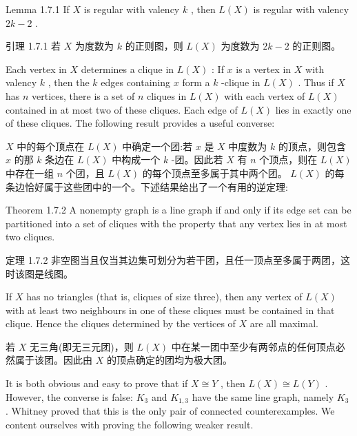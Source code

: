 \documentclass[10pt]{article}
\begin{document}
Lemma 1.7.1 If \(X\) is regular with valency \(k\) , then \(L\left( X\right)\) is regular with valency \({2k} - 2\) .

\begin{tcolorbox}\relax
引理 1.7.1 若 \(X\) 为度数为 \(k\) 的正则图，则 \(L\left( X\right)\) 为度数为 \({2k} - 2\) 的正则图。
\end{tcolorbox}

Each vertex in \(X\) determines a clique in \(L\left( X\right)\) : If \(x\) is a vertex in \(X\) with valency \(k\) , then the \(k\) edges containing \(x\) form a \(k\) -clique in \(L\left( X\right)\) . Thus if \(X\) has \(n\) vertices, there is a set of \(n\) cliques in \(L\left( X\right)\) with each vertex of \(L\left( X\right)\) contained in at most two of these cliques. Each edge of \(L\left( X\right)\) lies in exactly one of these cliques. The following result provides a useful converse:

\begin{tcolorbox}\relax
\(X\) 中的每个顶点在 \(L\left( X\right)\) 中确定一个团:若 \(x\) 是 \(X\) 中度数为 \(k\) 的顶点，则包含 \(x\) 的那 \(k\) 条边在 \(L\left( X\right)\) 中构成一个 \(k\) -团。因此若 \(X\) 有 \(n\) 个顶点，则在 \(L\left( X\right)\) 中存在一组 \(n\) 个团，且 \(L\left( X\right)\) 的每个顶点至多属于其中两个团。 \(L\left( X\right)\) 的每条边恰好属于这些团中的一个。下述结果给出了一个有用的逆定理:
\end{tcolorbox}

Theorem 1.7.2 A nonempty graph is a line graph if and only if its edge set can be partitioned into a set of cliques with the property that any vertex lies in at most two cliques.

\begin{tcolorbox}\relax
定理 1.7.2 非空图当且仅当其边集可划分为若干团，且任一顶点至多属于两团，这时该图是线图。
\end{tcolorbox}

If \(X\) has no triangles (that is, cliques of size three), then any vertex of \(L\left( X\right)\) with at least two neighbours in one of these cliques must be contained in that clique. Hence the cliques determined by the vertices of \(X\) are all maximal.

\begin{tcolorbox}\relax
若 \(X\) 无三角(即无三元团)，则 \(L\left( X\right)\) 中在某一团中至少有两邻点的任何顶点必然属于该团。因此由 \(X\) 的顶点确定的团均为极大团。
\end{tcolorbox}

It is both obvious and easy to prove that if \(X \cong  Y\) , then \(L\left( X\right)  \cong  L\left( Y\right)\) . However, the converse is false: \({K}_{3}\) and \({K}_{1,3}\) have the same line graph, namely \({K}_{3}\) . Whitney proved that this is the only pair of connected counterexamples. We content ourselves with proving the following weaker result.
\end{document}

